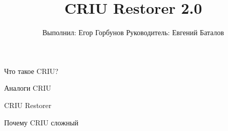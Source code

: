 
\makeatletter
{}
\makeatother
\graphicspath{{./fig/}}

\title{CRIU Restorer 2.0}
\author[Егор Горбунов]{
	\hspace{6cm} Выполнил: \hfill Егор Горбунов 
	\newline
	\hspace*{6cm} Руководитель:  \hfill Евгений Баталов
}


\maketitle

\begin{frame}{Что такое CRIU?}
\end{frame}

\begin{frame}{Аналоги CRIU}
\end{frame}

\begin{frame}{CRIU Restorer}
\end{frame}

\begin{frame}{Почему CRIU сложный}
\end{frame}

